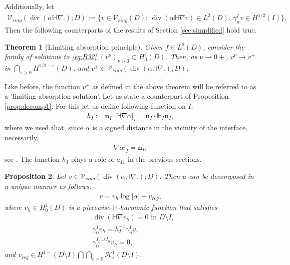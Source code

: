 \documentclass[report]{elsarticle}
\newtheorem{theorem}{Theorem}[section]
\newtheorem{proposition}[theorem]{Proposition}
\numberwithin{theorem}{section}
\renewcommand{\vec}[1]{\mathbf{#1}}
\newcommand{\re}{\varepsilon}
\begin{document}
Additionally, let 
\begin{align*}
	\mathcal{V}_{sing}(\operatorname{div}(\alpha\mathbb{H}\nabla.); D):=\{v\in \mathcal{V}_{sing}(D): \, \operatorname{div}(\alpha\mathbb{H}\nabla v)\in L^2(D), \, \gamma_n^I v\in H^{1/2}(I)\}.
\end{align*}
Then the following counterparts of the results of Section \ref{sec:simplified} hold true.
\begin{theorem}[Limiting absorption principle]
	\label{theorem:LAP2}
	Given $f\in L^2(D)$, consider the family of solutions to \eqref{eq:B32} $(v^{\nu})_{\nu>0}\subset H^1_0(D)$. Then, as $\nu\rightarrow 0+$, $v^{\nu}\rightarrow v^+$ in  $\bigcap_{\varepsilon>0}H^{1/2-\varepsilon}(D)$, and $v^+\in \mathcal{V}_{sing}(\operatorname{div}(\alpha\mathbb{H}\nabla.); D)$. 
\end{theorem}
Like before, the function $v^+$ as defined in the above theorem will be referred to as a 'limiting absorption solution'.  
Let us state a counterpart of Proposition \ref{prop:decomp1}. For this let us define following function on $I$:
\begin{align}
	\label{eq:Hi}
	h_I:=\left.\vec{n}_I\cdot\mathbb{H}\nabla \alpha\right|_{I}=\vec{n}_I\cdot \mathbb{H}_I\vec{n}_I,
\end{align}
where we used that, since $\alpha$ is a signed distance in the vicinity of the interface, necessarily, \begin{align}\label{eq:alphaprop}\left.\nabla \alpha\right|_{I} =\vec{n}_I,
\end{align} see \cite [proof of Lemma 14.16]{gilbrag_trudinger}. The function $h_I$ plays a role of $a_{11}$ in the previous sections. 
\begin{proposition}
	\label{prop:decomp2}
	Let $v\in \mathcal{V}_{sing}(\operatorname{div}(\alpha\mathbb{H}\nabla.);D)$. 
	Then $u$ can be decomposed in a unique manner as follows: 
	\begin{align}
		\label{eq:decomp_pi0_2}
		v=v_h\log|\alpha|+v_{reg},
	\end{align}
	where $v_h\in H^1_0(D)$ is a piecewise-$\mathbb{H}$-harmonic function that satisfies 
	\begin{align*}
		&\operatorname{div}(\mathbb{H}\nabla v_h)=0 \text{ in }D\setminus I, \\
		&\gamma_0^I v_h=h_{I}^{-1}\gamma_n^I v,\\
		&\gamma_0^{I_p\cup I_n}v_h=0,
	\end{align*}
	and $v_{reg}\in {H}^{1-}(D\setminus I)\bigcap \bigcap_{\varepsilon>0}\mathcal{H}^1_{\re}(D\setminus I)$. 
\end{proposition}
\end{document}
